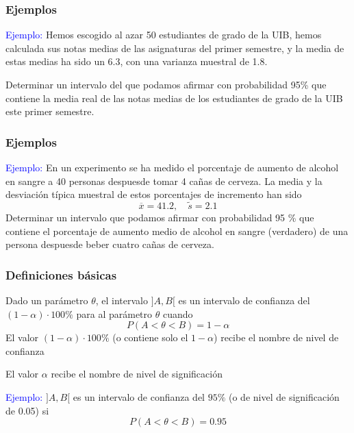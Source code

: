 \documentclass[12pt,t]{beamer}\usepackage[]{graphicx}\usepackage[]{color}
\newcommand{\blue}[1]{\textcolor{blue}{#1}}
\renewcommand{\emph}[1]{{\color{red}#1}}
\theoremstyle{plain}
\theoremstyle{definition}
\begin{document}
\begin{frame}
\frametitle{Ejemplos}


\blue{Ejemplo:} 
Hemos escogido al azar 50 estudiantes de grado de la UIB, hemos calculada sus notas medias de las asignaturas del primer semestre, y la media de estas medias ha sido un 6.3, con una varianza muestral de 1.8.\medskip

Determinar un intervalo del que podamos afirmar con probabilidad 95\% que contiene la media real de las notas medias de los estudiantes de grado de la UIB este primer semestre.
\end{frame}


\begin{frame}
\frametitle{Ejemplos}


\blue{Ejemplo:} En un experimento se ha medido el porcentaje de aumento de alcohol en sangre a 40 personas despuesde tomar 4 cañas de cerveza. La media y la desviación típica muestral de estos porcentajes de incremento han sido
$$
\overline{x}=41.2,\quad \widetilde{s}=2.1
$$
Determinar un intervalo que podamos afirmar con probabilidad 95 \% que contiene el porcentaje de aumento medio de alcohol en sangre (verdadero) de una persona despuesde beber cuatro cañas de cerveza.
\end{frame}




\begin{frame}
\frametitle{Definiciones básicas}

Dado un parámetro $\theta$, el intervalo $]A,B[$ es un \emph{intervalo de confianza} del
$(1-\alpha)\cdot 100\% $ para al parámetro $\theta$ cuando
$$
P(A<\theta<B)=1-\alpha
$$
El valor $(1-\alpha)\cdot 100\% $ (o contiene solo el $1-\alpha$) recibe el nombre de \emph{nivel de confianza} 
\medskip

El valor $\alpha$ recibe el nombre de \emph{nivel de significación}
\medskip 


\blue{Ejemplo:} $]A,B[$ es un intervalo de confianza del $95\%$ (o de nivel de significación de 0.05) si
$$
P(A<\theta<B)=0.95
$$


\end{frame}
\end{document}
